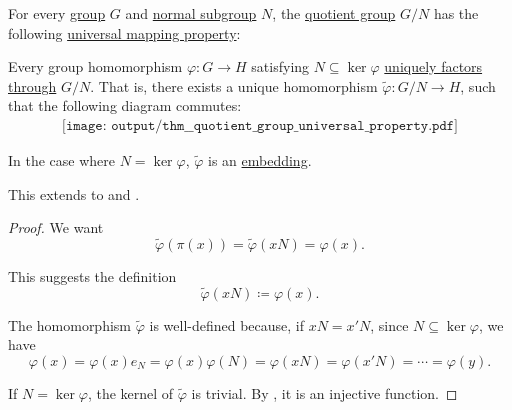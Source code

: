 \begin{theorem}\label{thm:quotient_group_universal_property}
  For every \hyperref[def:group]{group} \( G \) and \hyperref[thm:normal_subgroup_equivalences]{normal subgroup} \( N \), the \hyperref[def:group/quotient]{quotient group} \( G / N \) has the following \hyperref[rem:universal_mapping_property]{universal mapping property}:
  \begin{displayquote}
    Every group homomorphism \( \varphi: G \to H \) satisfying \( N \subseteq \ker \varphi \) \hyperref[def:factors_through]{uniquely factors through} \( G / N \). That is, there exists a unique homomorphism \( \widetilde{\varphi}: G / N \to H \), such that the following diagram commutes:
    \begin{equation}\label{eq:thm:quotient_group_universal_property/diagram}
      \begin{aligned}
        \texttt{[image: output/thm\_\_quotient\_group\_universal\_property.pdf]}
      \end{aligned}
    \end{equation}

    In the case where \( N = \ker \varphi \), \( \widetilde{\varphi} \) is an \hyperref[def:first_order_homomorphism_invertibility/embedding]{embedding}.
  \end{displayquote}

  This extends to  and .
\end{theorem}
\begin{proof}
  We want
  \begin{equation*}
    \widetilde{\varphi}(\pi(x)) = \widetilde{\varphi}(xN) = \varphi(x).
  \end{equation*}

  This suggests the definition
  \begin{equation*}
    \widetilde{\varphi}(xN) \coloneqq \varphi(x).
  \end{equation*}

  The homomorphism \( \widetilde{\varphi} \) is well-defined because, if \( x N = x' N \), since \( N \subseteq \ker \varphi \), we have
  \begin{equation*}
    \varphi(x)
    =
    \varphi(x) e_N
    =
    \varphi(x) \varphi(N)
    =
    \varphi(x N)
    =
    \varphi(x' N)
    =
    \cdots
    =
    \varphi(y).
  \end{equation*}

  If \( N = \ker \varphi \), the kernel of \( \widetilde{\varphi} \) is trivial. By , it is an injective function.
\end{proof}

